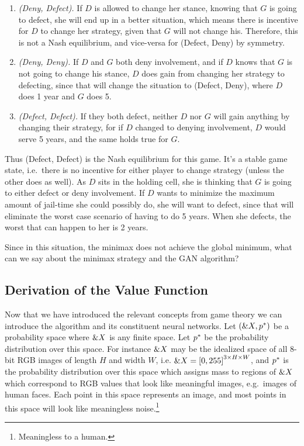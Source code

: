 \begin{enumerate}
  \item \textit{(Deny, Defect).} If $D$ is allowed to change her stance,
    knowing that $G$ is going to defect, she will end up in a better
    situation, which means there is incentive for $D$ to change her
    strategy, given that $G$ will not change his. Therefore, this is not
    a Nash equilibrium, and vice-versa for (Defect, Deny) by symmetry.
  \item \textit{(Deny, Deny).} If $D$ and $G$ both deny involvement, and
    if $D$ knows that $G$ is not going to change his stance, $D$ does
    gain from changing her strategy to defecting, since that will change
    the situation to (Defect, Deny), where $D$ does 1 year and $G$ does
    5.
  \item \textit{(Defect, Defect).} If they both defect, neither $D$ nor
    $G$ will gain anything by changing their strategy, for if $D$
    changed to denying involvement, $D$ would serve 5 years, and the same
    holds true for $G$.
\end{enumerate}

Thus (Defect, Defect) is the Nash equilibrium for this game. It's a stable game
state, i.e.\ there is no incentive for either player to change strategy (unless
the other does as well). As $D$ sits in the holding cell, she is thinking that
$G$ is going to either defect or deny involvement. If $D$ wants to minimize the
maximum amount of jail-time she could possibly do, she will want to defect,
since that will eliminate the worst case scenario of having to do 5 years. When
she defects, the worst that can happen to her is 2 years.

Since in this situation, the minimax does not achieve the global minimum, what
can we say about the minimax strategy and the GAN algorithm?

\subsection{Derivation of the Value Function}%
\label{sec:derivation}

Now that we have introduced the relevant concepts from game theory we can
introduce the algorithm and its constituent neural networks. Let $(\&X,
p^*)$ be a probability space where $\&X$ is any finite space. Let $p^*$ be
the probability distribution over this space. For instance $\&X$ may be the
idealized space of all 8-bit RGB images of length $H$ and width $W$, i.e.
$\&X = {[0, 255]}^{3 \times H \times W}$, and $p^*$ is the probability
distribution over this space which assigns mass to regions of $\&X$ which
correspond to RGB values that look like meaningful images, e.g.\ images of human
faces. Each point in this space represents an image, and most points in this
space will look like meaningless noise.\footnote{Meaningless to a human.}

